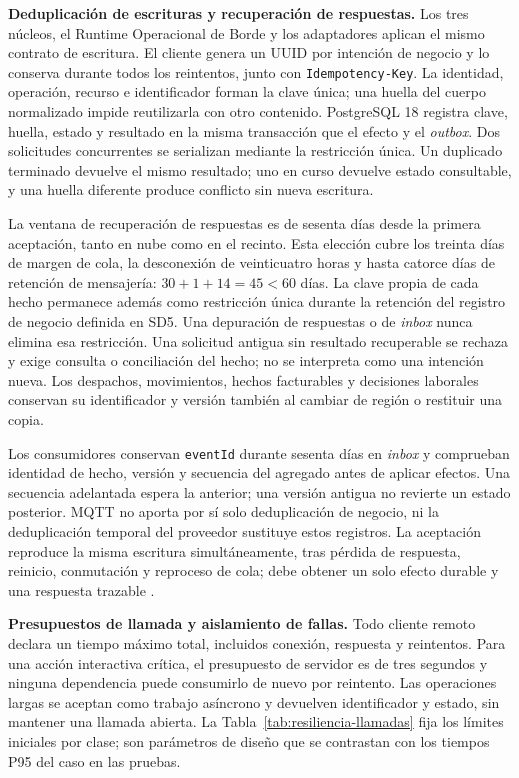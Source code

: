 \textbf{Deduplicación de escrituras y recuperación de respuestas.}
Los tres núcleos, el Runtime Operacional de Borde y los adaptadores aplican el mismo contrato de escritura. El cliente genera un UUID por intención de negocio y lo conserva durante todos los reintentos, junto con \texttt{Idempotency-Key}. La identidad, operación, recurso e identificador forman la clave única; una huella del cuerpo normalizado impide reutilizarla con otro contenido. PostgreSQL 18 registra clave, huella, estado y resultado en la misma transacción que el efecto y el \emph{outbox}. Dos solicitudes concurrentes se serializan mediante la restricción única. Un duplicado terminado devuelve el mismo resultado; uno en curso devuelve estado consultable, y una huella diferente produce conflicto sin nueva escritura.

La ventana de recuperación de respuestas es de sesenta días desde la primera aceptación, tanto en nube como en el recinto. Esta elección cubre los treinta días de margen de cola, la desconexión de veinticuatro horas y hasta catorce días de retención de mensajería: $30+1+14=45<60$ días. La clave propia de cada hecho permanece además como restricción única durante la retención del registro de negocio definida en SD5. Una depuración de respuestas o de \emph{inbox} nunca elimina esa restricción. Una solicitud antigua sin resultado recuperable se rechaza y exige consulta o conciliación del hecho; no se interpreta como una intención nueva. Los despachos, movimientos, hechos facturables y decisiones laborales conservan su identificador y versión también al cambiar de región o restituir una copia.

Los consumidores conservan \texttt{eventId} durante sesenta días en \emph{inbox} y comprueban identidad de hecho, versión y secuencia del agregado antes de aplicar efectos. Una secuencia adelantada espera la anterior; una versión antigua no revierte un estado posterior. MQTT no aporta por sí solo deduplicación de negocio, ni la deduplicación temporal del proveedor sustituye estos registros. La aceptación reproduce la misma escritura simultáneamente, tras pérdida de respuesta, reinicio, conmutación y reproceso de cola; debe obtener un solo efecto durable y una respuesta trazable \parencite[RT-02.06/07, p.~7]{pucv-transversal}.

\textbf{Presupuestos de llamada y aislamiento de fallas.}
Todo cliente remoto declara un tiempo máximo total, incluidos conexión, respuesta y reintentos. Para una acción interactiva crítica, el presupuesto de servidor es de tres segundos y ninguna dependencia puede consumirlo de nuevo por reintento. Las operaciones largas se aceptan como trabajo asíncrono y devuelven identificador y estado, sin mantener una llamada abierta. La Tabla~\ref{tab:resiliencia-llamadas} fija los límites iniciales por clase; son parámetros de diseño que se contrastan con los tiempos P95 del caso en las pruebas.

